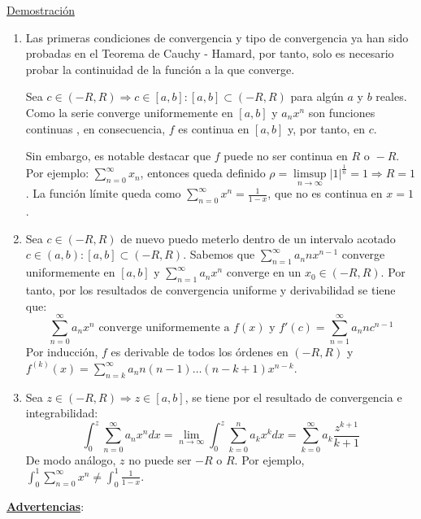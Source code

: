 \documentclass[10pt,a4paper,openright]{book}
\begin{document}
\underline{Demostración}
\begin{enumerate}
\item Las primeras condiciones de convergencia y tipo de convergencia ya han sido probadas en el Teorema de Cauchy - Hamard, por tanto, solo es necesario probar la continuidad de la función a la que converge.

Sea $c \in (-R, R)\Rightarrow c\in [a,b] : [a,b] \subset (-R, R)$ para algún $a$ y $b$ reales. Como la serie converge uniformemente en $[a,b]$ y $a_n x^n$  son funciones continuas , en consecuencia, $f$ es continua en $[a,b]$ y, por tanto, en $c$.

Sin embargo, es notable destacar que $f$ puede no ser continua en $R \mbox{ o } -R$. Por ejemplo: $\sum_{n=0}^{\infty} x_n$, entonces queda definido $\rho = \underset{n \to \infty}\limsup |1|^{\frac{1}{n}} = 1 \Rightarrow R=1$. La función límite queda como $\sum_{n=0}^{\infty} x^n= \frac{1}{1-x}$, que no es continua en $x=1$.

\item Sea $c \in (-R, R)$ de nuevo puedo meterlo dentro de un intervalo acotado $c \in (a,b) : [a,b] \subset (-R, R)$. Sabemos que $\sum_{n=1}^{\infty} a_n n x^{n-1}$ converge uniformemente en $[a,b]$ y $\sum_{n=1}^{\infty} a_n x^n$ converge en un $x_0 \in (-R, R)$. Por tanto, por los resultados de convergencia uniforme y derivabilidad se tiene que:
$$\sum_{n=0}^{\infty} a_n x^n \mbox{ converge uniformemente a } f(x) \mbox{ y } f'(c) = \sum_{n=1}^{\infty} a_n n c^{n-1}$$
Por inducción, $f$ es derivable de todos los órdenes en $(-R, R)$ y $f^{(k)}(x) = \sum_{n = k}^{\infty} a_n n (n-1) \ldots (n- k + 1) x^{n-k}$.

\item Sea $z\in (-R,R)\Rightarrow z\in [a,b]$, se tiene por el resultado de convergencia e integrabilidad:
$$\int_{0}^{z} \sum_{n=0}^{\infty} a_n x^n dx = \lim_{n \to \infty} \int_{0}^{z} \sum_{k=0}^{n} a_k x^k dx = \sum_{k=0}^{\infty} a_k \frac{z^{k+1}}{k+1}$$
De modo análogo, $z$ no puede ser $-R$ o $R$. Por ejemplo, $\int_{0}^{1} \sum_{n=0}^{\infty} x^n \neq \int_{0}^{1} \frac{1}{1-x}$.
\end{enumerate}

\underline{\textbf{Advertencias}}:
\end{document}
